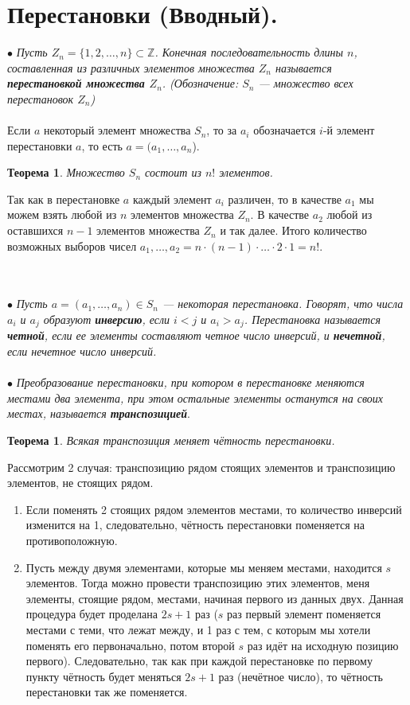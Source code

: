 \section{Перестановки (Вводный).}
$\bullet$ \textit{Пусть $Z_n = \{1,2,\dots,n\} \subset \mathbb{Z}$. Конечная последовательность длины $n$, составленная из различных элементов множества $Z_n$ называется \textbf{перестановкой множества $Z_n$}.
	(Обозначение: $S_n$ --- множество всех перестановок $Z_n$)}\\\\
Если $a$ некоторый элемент множества $S_n$, то за $a_i$ обозначается $i$-й элемент перестановки $a$, то есть $a = (a_1,\dots,a_n$).
\newtheorem*{t9_3}{Теорема}
\begin{t9_3}
	Множество $S_n$ состоит из $n!$ элементов.
\end{t9_3}
\begin{Proof}
	Так как в перестановке $a$ каждый элемент $a_i$ различен, то в качестве $a_1$ мы можем взять любой из $n$ элементов множества $Z_n$.
	В качестве $a_2$ любой из оставшихся $n-1$ элементов множества $Z_n$ и так далее. Итого количество возможных выборов чисел $a_1,\dots,a_2 = n\cdot(n-1)\cdot\ldots\cdot2\cdot1 = n!.$ 
\end{Proof}\\\\
$\bullet$ \textit{Пусть $a = (a_1,\dots,a_n)\in S_n$ --- некоторая перестановка. Говорят, что числа $a_i$ и $a_j$ образуют \textbf{инверсию}, если $i < j$ и $a_i > a_j$. Перестановка называется \textbf{четной}, если ее элементы составляют четное число инверсий, и \textbf{нечетной}, если нечетное число инверсий.}\\\\
$\bullet$ \textit{Преобразование перестановки, при котором в перестановке меняются местами два элемента, при этом остальные элементы останутся на своих местах, называется \textbf{транспозицией}}.
\newtheorem*{t3_2}{Теорема}
\begin{t3_2}
	Всякая транспозиция меняет чётность перестановки.
\end{t3_2}
\begin{Proof}
	Рассмотрим 2 случая: транспозицию рядом стоящих элементов и транспозицию элементов, не
	стоящих рядом.
	\begin{enumerate}
		\item Если поменять 2 стоящих рядом элементов местами, то количество инверсий изменится на 1, следовательно, чётность перестановки поменяется на противоположную.
		\item Пусть между двумя элементами, которые мы меняем местами, находится $s$ элементов. Тогда можно провести транспозицию этих элементов, меня элементы, стоящие рядом, местами, начиная первого из данных двух. Данная процедура будет проделана $2s+1$ раз ($s$ раз первый элемент поменяется местами с теми, что лежат между, и 1 раз с тем, с которым мы хотели поменять его первоначально, потом второй $s$ раз идёт на исходную позицию первого). Следовательно, так как при каждой перестановке по первому пункту чётность будет меняться $2s+1$ раз (нечётное число), то чётность перестановки так же поменяется.
	\end{enumerate}
\end{Proof}
